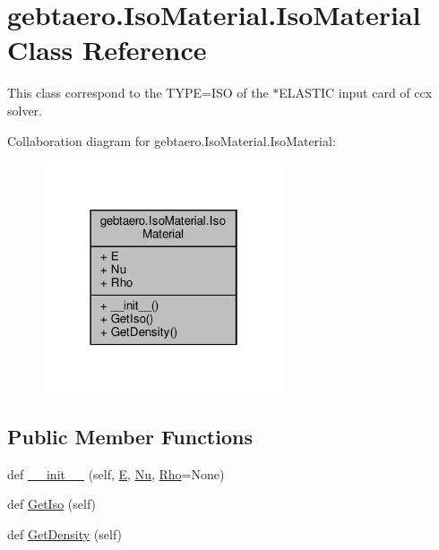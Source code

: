 \hypertarget{classgebtaero_1_1_iso_material_1_1_iso_material}{}\section{gebtaero.\+Iso\+Material.\+Iso\+Material Class Reference}
\label{classgebtaero_1_1_iso_material_1_1_iso_material}


This class correspond to the T\+Y\+PE=I\+SO of the $\ast$\+E\+L\+A\+S\+T\+IC input card of ccx solver.  




Collaboration diagram for gebtaero.\+Iso\+Material.\+Iso\+Material\+:\nopagebreak
\begin{figure}[H]
\begin{center}
\leavevmode
\includegraphics[width=202pt]{classgebtaero_1_1_iso_material_1_1_iso_material__coll__graph}
\end{center}
\end{figure}
\subsection*{Public Member Functions}
\begin{DoxyCompactItemize}
\item 
def \hyperlink{classgebtaero_1_1_iso_material_1_1_iso_material_ae9bef5bb23ffa56bd8342ecb0bf11ced}{\+\_\+\+\_\+init\+\_\+\+\_\+} (self, \hyperlink{classgebtaero_1_1_iso_material_1_1_iso_material_a95ef904760eb41f521d8a921fc44e5ba}{E}, \hyperlink{classgebtaero_1_1_iso_material_1_1_iso_material_a1a590e5600152a083c4ee3d0fb12451a}{Nu}, \hyperlink{classgebtaero_1_1_iso_material_1_1_iso_material_ace8e4cdd649efe5f36fd0093afa6b93a}{Rho}=None)
\item 
def \hyperlink{classgebtaero_1_1_iso_material_1_1_iso_material_aa8457a623f8f6f0e390acecea84b7ae4}{Get\+Iso} (self)
\item 
def \hyperlink{classgebtaero_1_1_iso_material_1_1_iso_material_a8efa18b7c42252bca0f1232916545920}{Get\+Density} (self)
\end{DoxyCompactItemize}
